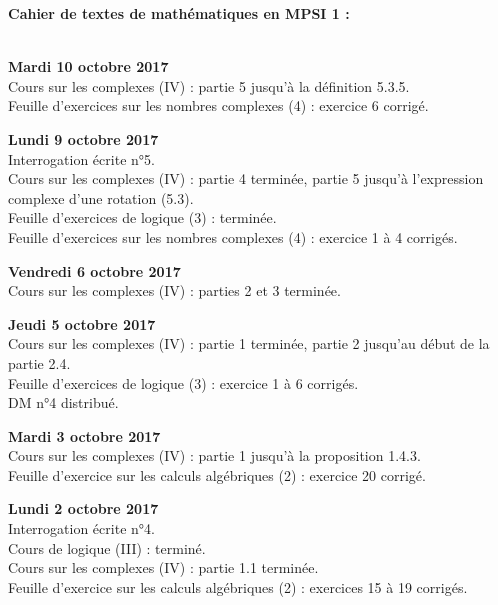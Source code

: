 \documentclass[12pt,a4paper]{article}
\begin{document}
\begin{center}
\Large\bf Cahier de textes de mathématiques en MPSI 1 :
\end{center}
\vspace{1cm}
\vspace{.4cm}\\

\noindent\textbf{Mardi 10 octobre 2017}\\
\bu{} Cours sur les complexes (IV) : partie 5 jusqu'à la définition 5.3.5. \\
\bu{} Feuille d'exercices sur les nombres complexes (4) : exercice 6 corrigé. \\
\vspace{.4cm}

\noindent\textbf{Lundi 9 octobre 2017}\\
\bu{} Interrogation écrite n°5.\\
\bu{} Cours sur les complexes (IV) : partie 4 terminée, partie 5 jusqu'à l'expression complexe d'une rotation (5.3). \\
\bu{} Feuille d'exercices de logique (3) : terminée. \\
\bu{} Feuille d'exercices sur les nombres complexes (4) : exercice 1 à 4 corrigés. \\
\vspace{.4cm}

\noindent\textbf{Vendredi 6 octobre 2017}\\
\bu{} Cours sur les complexes (IV) : parties 2 et 3 terminée. \\
\vspace{.4cm}

\noindent\textbf{Jeudi 5 octobre 2017}\\
\bu{} Cours sur les complexes (IV) : partie 1 terminée, partie 2 jusqu'au début de la partie 2.4. \\
\bu{} Feuille d'exercices de logique (3) : exercice 1 à 6 corrigés. \\
\bu{} DM n°4 distribué.\\
\vspace{.4cm}

\noindent\textbf{Mardi 3 octobre 2017}\\
\bu{} Cours sur les complexes (IV) : partie 1 jusqu'à la proposition 1.4.3. \\
\bu{} Feuille d'exercice sur les calculs algébriques (2) : exercice 20 corrigé. \\
\vspace{.4cm}

\noindent\textbf{Lundi 2 octobre 2017}\\
\bu{} Interrogation écrite n°4.\\
\bu{} Cours de logique (III) : terminé. \\
\bu{} Cours sur les complexes (IV) : partie 1.1 terminée. \\
\bu{} Feuille d'exercice sur les calculs algébriques (2) : exercices 15 à 19 corrigés. \\
\vspace{.4cm}
\end{document}
